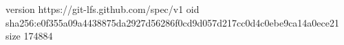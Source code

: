 version https://git-lfs.github.com/spec/v1
oid sha256:e0f355a09a4438875da2927d56286f0cd9d057d217cc0d4c0ebe9ca14a0ece21
size 174884
